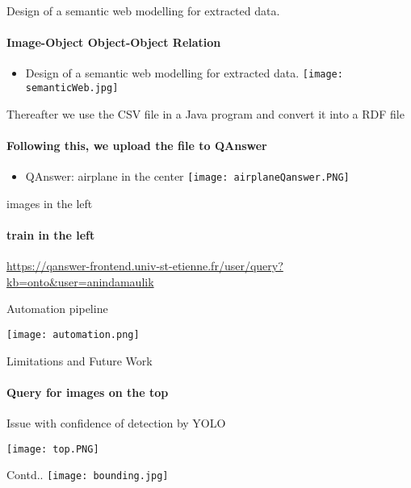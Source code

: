 \documentclass{beamer}
\begin{document}
\begin{frame}{Design of a semantic web modelling for extracted data.}
\framesubtitle{Image-Object Object-Object Relation}
\begin{itemize}
\item Design of a semantic web modelling for extracted data.
\texttt{[image: semanticWeb.jpg]}
\end{itemize}
\end{frame}

\begin{frame}{Thereafter we use the CSV file in a Java program and convert it into a RDF file}
\framesubtitle{Following this, we upload the file to QAnswer}
\begin{itemize}
\item QAnswer: airplane  in the center
\texttt{[image: airplaneQanswer.PNG]}
\end{itemize}
\end{frame}

\begin{frame}{images in the left}
\framesubtitle{train in the left}

\begin{itemize}
\url{https://qanswer-frontend.univ-st-etienne.fr/user/query?kb=onto&user=anindamaulik}
\end{itemize}
\end{frame}

\begin{frame}{Automation pipeline}



  \begin{itemize}
      
      \texttt{[image: automation.png]}

  \end{itemize}
 
\end{frame}

\begin{frame}{Limitations and Future Work}
\framesubtitle{Query for images on the top}
\item Issue with confidence of detection by YOLO



  \begin{itemize}
      
      \texttt{[image: top.PNG]}

  \end{itemize}
 
\end{frame}
\begin{frame}{Contd..}
\texttt{[image: bounding.jpg]}

 
\end{frame}
\end{document}
